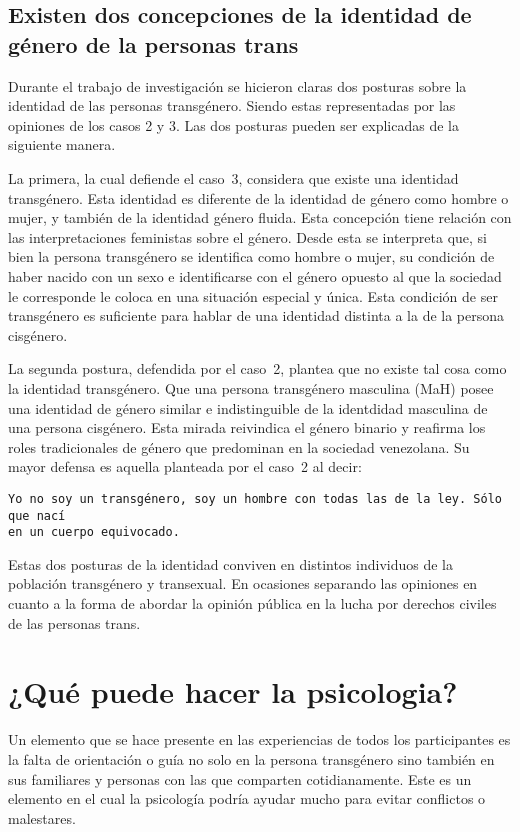 \subsection[Dos concepciones de la identidad]{Existen dos concepciones de la
identidad de género de la personas trans}

Durante el trabajo de investigación se hicieron claras dos posturas sobre la
identidad de las personas transgénero. Siendo estas representadas por las
opiniones de los casos 2 y 3. Las dos posturas pueden ser explicadas de la
siguiente manera.

La primera, la cual defiende el caso~3, considera que existe una identidad
transgénero. Esta identidad es diferente de la identidad de género como hombre o
mujer, y también de la identidad género fluida. Esta concepción tiene relación
con las interpretaciones feministas sobre el género. Desde esta se interpreta
que, si bien la persona transgénero se identifica como hombre o mujer, su
condición de haber nacido con un sexo e identificarse con el género opuesto al
que la sociedad le corresponde le coloca en una situación especial y única. Esta
condición de ser transgénero es suficiente para hablar de una identidad distinta
a la de la persona cisgénero.

La segunda postura, defendida por el caso~2, plantea que no existe tal cosa como
la identidad transgénero. Que una persona transgénero masculina (MaH) posee una
identidad de género similar e indistinguible de la identdidad masculina de una
persona cisgénero. Esta mirada reivindica el género binario y reafirma los roles
tradicionales de género que predominan en la sociedad venezolana. Su mayor
defensa es aquella planteada por el caso~2 al decir:

\begin{verbatim}
Yo no soy un transgénero, soy un hombre con todas las de la ley. Sólo que nací
en un cuerpo equivocado.
\end{verbatim}

Estas dos posturas de la identidad conviven en distintos individuos de la
población transgénero y transexual. En ocasiones separando las opiniones en
cuanto a la forma de abordar la opinión pública en la lucha por derechos civiles
de las personas trans.

\section{¿Qué puede hacer la psicologia?}

Un elemento que se hace presente en las experiencias de todos los participantes
es la falta de orientación o guía no solo en la persona transgénero sino también
en sus familiares y personas con las que comparten cotidianamente. Este es un
elemento en el cual la psicología podría ayudar mucho para evitar conflictos o
malestares.

